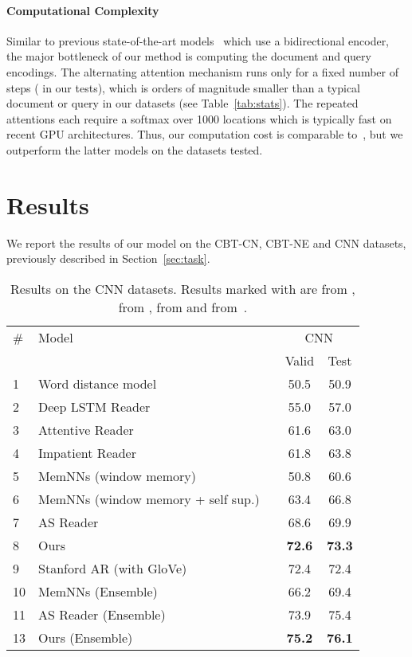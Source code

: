 \documentclass[11pt]{article}
\begin{document}
\paragraph{Computational Complexity} Similar to previous state-of-the-art models~\cite{watson,danqi} which use a bidirectional encoder, the major bottleneck of our method is computing the document and query encodings. The alternating attention mechanism runs only for a fixed number of steps ( in our tests), which is orders of magnitude smaller than a typical document or query in our datasets (see Table~\ref{tab:stats}).
The repeated attentions each require a softmax over 1000 locations which is typically fast on recent GPU architectures. Thus, our computation cost is comparable to~\cite{watson,danqi}, but we outperform the latter models on the datasets tested.
 
\section{Results}
We report the results of our model on the CBT-CN, CBT-NE and CNN datasets, previously described in Section~\ref{sec:task}.



\begin{table*}[t]
\small
\def\arraystretch{1.1}
\centering
\begin{tabular}{llccc}
\toprule
\# & Model & \phantom{abcd} & \multicolumn{2}{c}{CNN} \\
&& & Valid & Test \\
\midrule
\small{1}&Word distance model  && 50.5 & 50.9 \\
\small{2}&Deep LSTM Reader   && 55.0 & 57.0 \\
\small{3}&Attentive Reader   && 61.6 & 63.0 \\
\small{4}&Impatient Reader                               && 61.8 & 63.8 \\
\midrule
\small{5}&MemNNs (window memory)                         && 50.8 & 60.6 \\
\small{6}&MemNNs (window memory + self sup.)             && 63.4 & 66.8 \\
\small{7}&AS Reader                                      && 68.6 & 69.9 \\
\small{8}&Ours                                                 && \textbf{72.6} & \textbf{73.3} \\
\midrule
\small{9}&Stanford AR (with GloVe)                       && 72.4 & 72.4 \\
\midrule
\midrule
\small{10}&MemNNs (Ensemble)                             && 66.2 & 69.4 \\
\small{11}&AS Reader (Ensemble)                            && 73.9 & 75.4 \\
\small{13}&Ours (Ensemble)                                     && \textbf{75.2} & \textbf{76.1} \\
\bottomrule
\end{tabular}
\caption{\label{tab:cnn}Results on the CNN datasets. Results marked with  are from \protect\cite{hermann2015teaching},  from \protect\cite{hill2015goldilocks},  from \protect\cite{watson} and  from~\protect\cite{danqi}.}
\end{table*}
\end{document}
